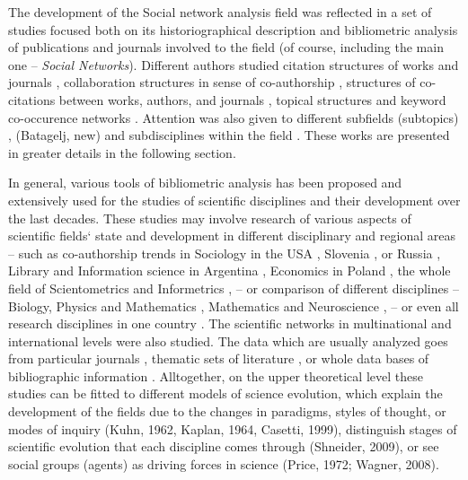 \documentclass[11pt]{article} %
\newcommand{\Remark}[1]{\ifodd\value{page} \normalmarginpar
 \else \reversemarginpar \fi \marginpar{{\footnotesize #1}} }
\begin{document}
The development of the Social network analysis field was reflected in a set of studies focused both on its historiographical description \citep{SNAdev} and bibliometric analysis of publications and journals involved to the field (of course, including the main one -- \textit {Social Networks}). Different authors studied citation structures of works and journals \citep{normSci,leydes,Understand}, collaboration structures in sense of co-authorship \citep{SNAinf, leydes,Understand}, structures of co-citations between works, authors, and journals \citep{brandes}, topical structures and keyword co-occurence networks \citep{leydes,lookingglass}. Attention was also given to different subfields (subtopics)  \citep{central,kejzar, Understand}, (Batagelj, new) and subdisciplines within the field \citep{SNAinf,borgatti,lazer,varga}. These works are presented in greater details in the following section. \medskip 

In general, various tools of bibliometric analysis has been proposed and extensively used for the studies of scientific disciplines and their development over the last decades. These studies may involve research of various aspects of scientific fields` state and development in different disciplinary and regional areas -- such as co-authorship trends in Sociology in the USA \citep{moody, sociol}, Slovenia \citep{mali}, or Russia \citep{sokolov},  Library and Information science in Argentina \citep{rodriguez}, Economics in Poland \citep{polish}, the whole field of  Scientometrics and Informetrics \citep{hou}, -- or comparison of different disciplines -- Biology, Physics and Mathematics \citep{newman1, newman4}, Mathematics and Neuroscience \citep{Evol}, -- or even all research disciplines in one country \citep{kroneg,ferligoj,cugmas}. The scientific networks in multinational \citep{glaenzel} and international \citep{wagner} levels were also studied. The data which are usually analyzed goes from particular journals \citep{conflict}, thematic sets of literature \citep{dna,PeerRew}, or whole data bases of bibliographic information \citep{kroneg}. \Remark{Should we include the following?}Alltogether, on the upper theoretical level these studies can be fitted to different models of science evolution, which explain the development of the fields due to the changes in paradigms, styles of thought, or modes of inquiry (Kuhn, 1962, Kaplan, 1964, Casetti, 1999), distinguish stages of scientific evolution that each discipline comes through (Shneider, 2009), or see social groups (agents) as driving forces in science (Price, 1972; Wagner, 2008). \medskip 
\end{document}
